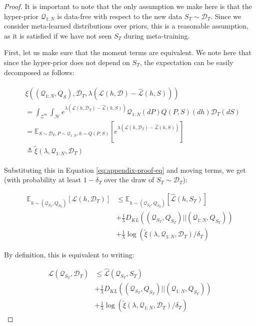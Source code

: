 \documentclass[letterpaper]{article} %
\theoremstyle{definition}
\newcommand{\Expect}[2]{\mathbb{E}_{#1}\left [#2 \right ]}
\begin{document}
\begin{proof}
	It is important to note that the only assumption we make here is that the hyper-prior $\mathcal{Q}_{1:N}$ is data-free with respect to the new data $S_T\sim \mathcal{D}_T$. Since we consider meta-learned distributions over priors, this is a reasonable assumption, as it is satisfied if we have not seen $S_T$ during meta-training.
	
	First, let us make sure that the moment terms are equivalent. We note here that since the hyper-prior does not depend on $S_T$, the expectation can be easily decomposed as follows:
	
	\begin{align*}
	\begin{split}
		&\xi\left ((\mathcal{Q}_{1:N}, Q_S), \mathcal{D}_T, \lambda(\mathcal{L}(h,\mathcal{D})-\hat{\mathcal{L}}(h,S))\right )\\
		&=\int_{\mathcal{Z}^m}\int_{\mathcal{H}}e^{\lambda\left (\mathcal{L}(h, \mathcal{D}_T)-\hat{\mathcal{L}}(h, S)\right )}\mathcal{Q}_{1:N}(dP)Q(P,S)(dh)\mathcal{D}_T(dS)\\
		&=\Expect{S\sim \mathcal{D}_T, P\sim \mathcal{Q}_{1:N}, h\sim Q(P,S)}{e^{\lambda\left (\mathcal{L}(h, \mathcal{D}_T)-\hat{\mathcal{L}}(h, S)\right )}}\\
		&\triangleq \tilde{\xi}(\lambda,\mathcal{Q}_{1:N},\mathcal{D}_T)
	\end{split}
	\end{align*}
	
	Substituting this in Equation \ref{eq:appendix-proof-eq} and moving terms, we get (with probability at least $1-\delta_T$ over the draw of $S_T\sim \mathcal{D}_T$):
	
	\begin{equation} 
	\begin{split}
	\Expect{h\sim (\mathcal{Q}_{S_T}, Q_{S_T})}{\mathcal{L}(h,\mathcal{D}_T)} &\leq \Expect{h\sim (\mathcal{Q}_{S_T}, Q_{S_T})}{\hat{\mathcal{L}}(h,S_T)}\\
	&+\frac{1}{\lambda} D_{KL}((\mathcal{Q}_{S_T}, Q_{S_T})||(\mathcal{Q}_{1:N}, Q_{S_T}))\\
	&+\frac{1}{\lambda}\log\left (\tilde{\xi}(\lambda,\mathcal{Q}_{1:N},\mathcal{D}_T)/\delta_T\right )
	\end{split}
	\end{equation}
	
	By definition, this is equivalent to writing:
	
	\begin{equation} \label{eq:appendix-proof-eq-2}
	\begin{split}
	\mathcal{L}(\mathcal{Q}_{S_T},\mathcal{D}_T) &\leq \hat{\mathcal{L}}(\mathcal{Q}_{S_T},S_T)\\ &+\frac{1}{\lambda} D_{KL}((\mathcal{Q}_{S_T}, Q_{S_T})||(\mathcal{Q}_{1:N}, Q_{S_T})) \\
	&+\frac{1}{\lambda}\log\left (\tilde{\xi}(\lambda,\mathcal{Q}_{1:N},\mathcal{D}_T)/\delta_T\right )
	\end{split}
	\end{equation}
	

\end{proof}
\end{document}
